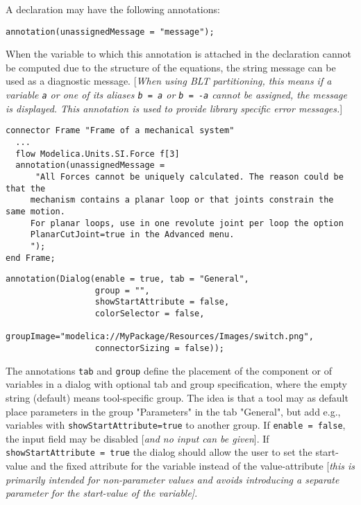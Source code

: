 A declaration may have the following annotations:
\begin{lstlisting}[language=modelica]
  annotation(unassignedMessage = "message");
\end{lstlisting}

When the variable to which this annotation is attached in the
declaration cannot be computed due to the structure of the equations,
the string message can be used as a diagnostic message. {[}\emph{When
using BLT partitioning, this means if a variable \lstinline!a! or one of its
aliases \lstinline!b = a! or \lstinline!b = -a! cannot be assigned, the message is
displayed. This annotation is used to provide library specific error
messages.}{]}

\begin{example}
\begin{lstlisting}[language=modelica]
connector Frame "Frame of a mechanical system"
  ...
  flow Modelica.Units.SI.Force f[3]
  annotation(unassignedMessage =
      "All Forces cannot be uniquely calculated. The reason could be that the
     mechanism contains a planar loop or that joints constrain the same motion.
     For planar loops, use in one revolute joint per loop the option
     PlanarCutJoint=true in the Advanced menu.
     ");
end Frame;
\end{lstlisting}
\end{example}

\begin{lstlisting}[language=modelica]
annotation(Dialog(enable = true, tab = "General",
                  group = "",
                  showStartAttribute = false,
                  colorSelector = false,
                  groupImage="modelica://MyPackage/Resources/Images/switch.png",
                  connectorSizing = false));
\end{lstlisting}

The annotations \lstinline!tab! and \lstinline!group! define the placement of
the component or of variables in a dialog with optional tab and group
specification, where the empty string (default) means tool-specific group.
The idea is that a tool may as default place parameters in the group "Parameters" in the tab "General",
but add e.g., variables with \lstinline!showStartAttribute=true! to another group.
If \lstinline!enable = false!, the input field may
be disabled {[}\emph{and no input can be given}{]}. If
\lstinline!showStartAttribute = true! the dialog should allow the user to
set the start-value and the fixed attribute for the variable instead of
the value-attribute {[}\emph{this is primarily intended for
non-parameter values and avoids introducing a separate parameter for the
start-value of the variable{]}}.

